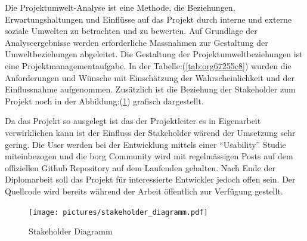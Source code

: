 Die Projektumwelt-Analyse ist eine Methode, die Beziehungen,
Erwartungshaltungen und Einflüsse auf das Projekt durch interne und
externe soziale Umwelten zu betrachten und zu bewerten. Auf Grundlage
der Analyseergebnisse werden erforderliche Massnahmen zur Gestaltung
der Umweltbeziehungen abgeleitet. Die Gestaltung der
Projektumweltbeziehungen ist eine Projektmanagementaufgabe. In der
Tabelle:(\ref{tab:org67255c8}) wurden die Anforderungen und Wünsche
mit Einschätzung der Wahrscheinlichkeit und der Einflussnahme aufgenommen.
Zusätzlich ist die Beziehung der Stakeholder zum Projekt noch in der
Abbildung:(\ref{fig:orgd829ec8}) grafisch dargestellt.

Da das Projekt so ausgelegt ist das der Projektleiter es in Eigenarbeit
verwirklichen kann ist der Einfluss der Stakeholder wärend der Umsetzung sehr
gering. Die User werden bei der Entwicklung mittels einer "`Usability"' Studie
miteinbezogen und die \gls{borg} Community wird mit regelmässigen Posts auf dem
offiziellen Github Repository auf dem Laufenden gehalten.
Nach Ende der Diplomarbeit soll das Projekt für interessierte Entwickler jedoch
offen sein. Der Quellcode wird bereits während der Arbeit öffentlich zur
Verfügung gestellt.

\begin{figure}[htbp]
\centering
\texttt{[image: pictures/stakeholder\_diagramm.pdf]}
\caption{\label{fig:orgd829ec8}
Stakeholder Diagramm}
\end{figure}

